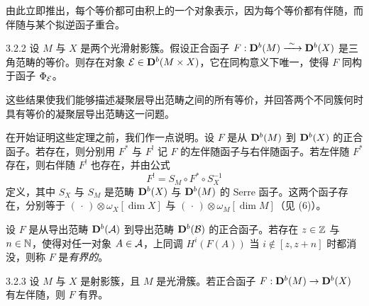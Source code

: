 由此立即推出，每个等价都可由积上的一个对象表示，因为每个等价都有伴随，而伴随与某个拟逆函子重合。

\begin{theorem}{3.2.2}
设 $M$ 与 $X$ 是两个光滑射影簇。假设正合函子 $F:\mathbf{D}^{b}(M)\xrightarrow{\ \sim\ }\mathbf{D}^{b}(X)$ 是三角范畴的等价。则存在对象 $\mathcal{E}\in\mathbf{D}^{b}(M\times X)$，它在同构意义下唯一，使得 $F$ 同构于函子 $\Phi_{\mathcal{E}}$。
\end{theorem}

这些结果使我们能够描述凝聚层导出范畴之间的所有等价，并回答两个不同簇何时具有等价的凝聚层导出范畴这一问题。

在开始证明这些定理之前，我们作一点说明。设 $F$ 是从 $\mathbf{D}^{b}(M)$ 到 $\mathbf{D}^{b}(X)$ 的正合函子。若存在，则分别用 $F^{*}$ 与 $F^{!}$ 记 $F$ 的左伴随函子与右伴随函子。若左伴随 $F^{*}$ 存在，则右伴随 $F^{!}$ 也存在，并由公式
\begin{equation*}
F^{!}=S_{M}\circ F^{*}\circ S_{X}^{-1}
\end{equation*}
定义，其中 $S_{X}$ 与 $S_{M}$ 是范畴 $\mathbf{D}^{b}(X)$ 与 $\mathbf{D}^{b}(M)$ 的 Serre 函子。这两个函子存在，分别等于 $(\,\cdot\,)\otimes\omega_{X}[\dim X]$ 与 $(\,\cdot\,)\otimes\omega_{M}[\dim M]$（见 (6)）。


设 $F$ 是从导出范畴 $\mathbf{D}^{b}(\mathcal{A})$ 到导出范畴 $\mathbf{D}^{b}(\mathcal{B})$ 的正合函子。若存在 $z\in\mathbb{Z}$ 与 $n\in\mathbb{N}$，使得对任一对象 $A\in\mathcal{A}$，上同调 $H^{i}(F(A))$ 当 $i\notin[z,z+n]$ 时都消没，则称 $F$ 是\emph{有界的}。


\begin{lemma}{3.2.3}
设 $M$ 与 $X$ 是射影簇，且 $M$ 是光滑簇。若正合函子 $F:\mathbf{D}^{b}(M)\to\mathbf{D}^{b}(X)$ 有左伴随，则 $F$ 有界。
\end{lemma}

